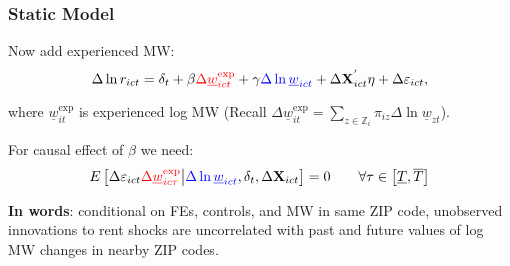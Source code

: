 \begin{frame}
	\frametitle{Static Model}
		
	Now add experienced MW:
	$$
	\Delta \ln r_{ict} = \delta_t +
	    \beta {\color{red}\Delta \underline{w}^{\text{exp}}_{ict}} +
		\gamma {\color{blue} \Delta \ln \underline{w}_{ict}} + 
		\Delta \mathbf{X}^{'}_{ict} \eta + 
		\Delta \varepsilon_{ict} ,
	$$
	
	where $\underline{w}^{\text{exp}}_{it}$ is experienced log MW {\small (Recall 
	$\Delta \underline{w}^{\text{exp}}_{it} = \sum_{z \in \mathbb{Z}_i} \pi_{i z} \Delta 
	\ln \underline{w}_{zt}$)}.

	\pause
	\vspace{2mm}
	For causal effect of $\beta$ we need:
	$$
	E \left[\Delta \varepsilon_{ict} {\color{red} \Delta 
	\underline{w}^{\text{exp}}_{ic\tau}} 
	\big| {\color{blue}\Delta \ln \underline{w}_{ict}}, \delta_t, \Delta 
	\mathbf{X}_{ict} \right] = 0
	\quad \quad \forall \tau \in \left[ \underline{T}, \overline{T} \right]
	$$
	
	\pause
	\vspace{2mm}
	\textbf{In words}: conditional on FEs, controls, and {\color{blue} MW in same ZIP 
	code}, unobserved innovations to rent shocks are uncorrelated with past and future 
	values of log MW changes {\color{red} in nearby ZIP codes}.
\end{frame}


